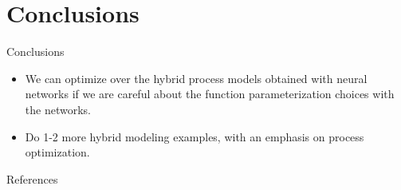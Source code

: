 \documentclass[xcolor=dvipsnames, 8pt]{beamer} %
\begin{document}
\section{Conclusions}
\begin{frame}{Conclusions}

	\begin{block}{}

	\begin{itemize}
		\item We can \alert{optimize over the hybrid process models obtained 
		with neural networks} if we are careful about the function 
		parameterization choices with the networks.
		\medskip
		\item Do 1-2 more hybrid modeling examples, with an emphasis on process 
		optimization.
	\end{itemize}

	\end{block}

\end{frame}

\begin{frame}{References}


\end{frame}
\end{document}

